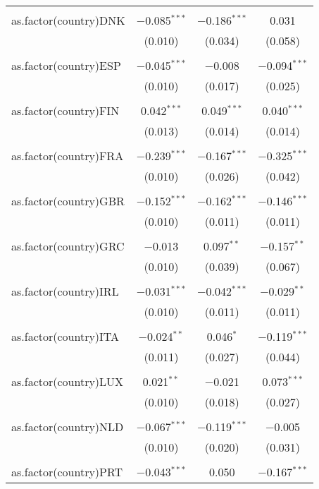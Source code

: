\begin{table}[!htbp]
\begin{tabular}{@{\extracolsep{5pt}}lccc}
  & & & \\ 
 as.factor(country)DNK & $-$0.085$^{***}$ & $-$0.186$^{***}$ & 0.031 \\ 
  & (0.010) & (0.034) & (0.058) \\ 
  & & & \\ 
 as.factor(country)ESP & $-$0.045$^{***}$ & $-$0.008 & $-$0.094$^{***}$ \\ 
  & (0.010) & (0.017) & (0.025) \\ 
  & & & \\ 
 as.factor(country)FIN & 0.042$^{***}$ & 0.049$^{***}$ & 0.040$^{***}$ \\ 
  & (0.013) & (0.014) & (0.014) \\ 
  & & & \\ 
 as.factor(country)FRA & $-$0.239$^{***}$ & $-$0.167$^{***}$ & $-$0.325$^{***}$ \\ 
  & (0.010) & (0.026) & (0.042) \\ 
  & & & \\ 
 as.factor(country)GBR & $-$0.152$^{***}$ & $-$0.162$^{***}$ & $-$0.146$^{***}$ \\ 
  & (0.010) & (0.011) & (0.011) \\ 
  & & & \\ 
 as.factor(country)GRC & $-$0.013 & 0.097$^{**}$ & $-$0.157$^{**}$ \\ 
  & (0.010) & (0.039) & (0.067) \\ 
  & & & \\ 
 as.factor(country)IRL & $-$0.031$^{***}$ & $-$0.042$^{***}$ & $-$0.029$^{**}$ \\ 
  & (0.010) & (0.011) & (0.011) \\ 
  & & & \\ 
 as.factor(country)ITA & $-$0.024$^{**}$ & 0.046$^{*}$ & $-$0.119$^{***}$ \\ 
  & (0.011) & (0.027) & (0.044) \\ 
  & & & \\ 
 as.factor(country)LUX & 0.021$^{**}$ & $-$0.021 & 0.073$^{***}$ \\ 
  & (0.010) & (0.018) & (0.027) \\ 
  & & & \\ 
 as.factor(country)NLD & $-$0.067$^{***}$ & $-$0.119$^{***}$ & $-$0.005 \\ 
  & (0.010) & (0.020) & (0.031) \\ 
  & & & \\ 
 as.factor(country)PRT & $-$0.043$^{***}$ & 0.050 & $-$0.167$^{***}$ \\ 

\end{tabular}
\end{table}

